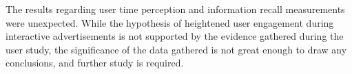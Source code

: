 	The results regarding user time perception and information recall measurements were unexpected. While the hypothesis of heightened user engagement during interactive advertisements is not supported by the evidence gathered during the user study, the significance of the data gathered is not great enough to draw any conclusions, and further study is required.

